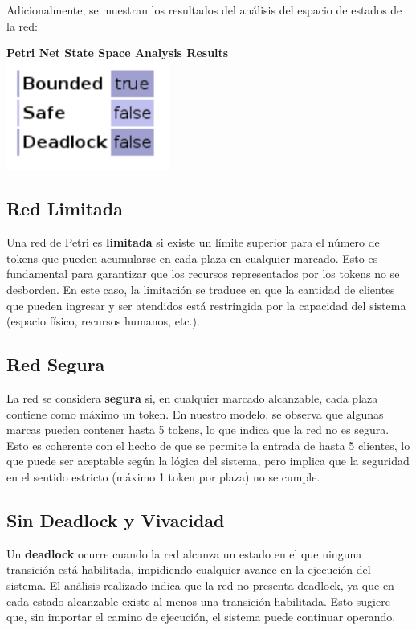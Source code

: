 \documentclass[12pt]{article}
\begin{document}
\bigskip

Adicionalmente, se muestran los resultados del análisis del espacio de estados de la red:

\begin{center}
    \textbf{Petri Net State Space Analysis Results}\\[0.5em]
    \includegraphics[width=0.4\textwidth]{Petri-Net-State.png}
\end{center}

\subsection{Red Limitada}
Una red de Petri es \textbf{limitada} si existe un límite superior para el número de tokens que pueden acumularse en cada plaza en cualquier marcado. Esto es fundamental para garantizar que los recursos representados por los tokens no se desborden.  
En este caso, la limitación se traduce en que la cantidad de clientes que pueden ingresar y ser atendidos está restringida por la capacidad del sistema (espacio físico, recursos humanos, etc.).

\subsection{Red Segura}
La red se considera \textbf{segura} si, en cualquier marcado alcanzable, cada plaza contiene como máximo un token.  
En nuestro modelo, se observa que algunas marcas pueden contener hasta 5 tokens, lo que indica que la red no es segura. Esto es coherente con el hecho de que se permite la entrada de hasta 5 clientes, lo que puede ser aceptable según la lógica del sistema, pero implica que la seguridad en el sentido estricto (máximo 1 token por plaza) no se cumple.

\subsection{Sin Deadlock y Vivacidad}

Un \textbf{deadlock} ocurre cuando la red alcanza un estado en el que ninguna transición está habilitada, impidiendo cualquier avance en la ejecución del sistema. El análisis realizado indica que la red no presenta deadlock, ya que en cada estado alcanzable existe al menos una transición habilitada. Esto sugiere que, sin importar el camino de ejecución, el sistema puede continuar operando.
\end{document}
